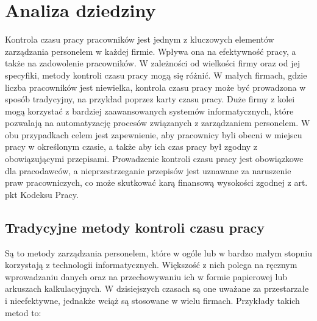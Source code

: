 \section{Analiza dziedziny}

Kontrola czasu pracy pracowników jest jednym z kluczowych elementów zarządzania personelem w każdej firmie. Wpływa ona na efektywność pracy, a także na zadowolenie pracowników. W zależności od wielkości firmy oraz od jej specyfiki, metody kontroli czasu pracy mogą się różnić. W małych firmach, gdzie liczba pracowników jest niewielka, kontrola czasu pracy może być prowadzona w sposób tradycyjny, na przykład poprzez karty czasu pracy. Duże firmy z kolei mogą korzystać z bardziej zaawansowanych systemów informatycznych, które pozwalają na automatyzację procesów związanych z zarządzaniem personelem. W obu przypadkach celem jest zapewnienie, aby pracownicy byli obecni w miejscu pracy w określonym czasie, a także aby ich czas pracy był zgodny z obowiązującymi przepisami. Prowadzenie kontroli czasu pracy jest obowiązkowe dla pracodawców, a nieprzestrzeganie przepisów jest uznawane za naruszenie praw pracowniczych, co może skutkować karą finansową wysokości zgodnej z art.  pkt  Kodeksu Pracy.

\subsection{Tradycyjne metody kontroli czasu pracy}

Są to metody zarządzania personelem, które w ogóle lub w bardzo małym stopniu korzystają z technologii informatycznych. Większość z nich polega na ręcznym wprowadzaniu danych oraz na przechowywaniu ich w formie papierowej lub arkuszach kalkulacyjnych. W dzisiejszych czasach są one uważane za przestarzałe i nieefektywne, jednakże wciąż są stosowane w wielu firmach. Przykłady takich metod to:

